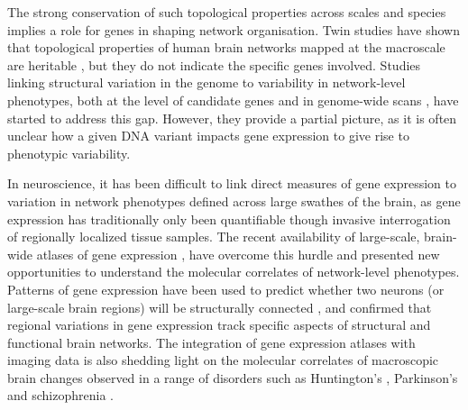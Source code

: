 The strong conservation of such topological properties across scales and species implies a role for genes in shaping network organisation. Twin studies have shown that topological properties of human brain networks mapped at the macroscale are heritable \citep{Smit2008,Fornito2011,VandenHeuvel2013e,Bohlken2014,Sinclair2015,Zhan2015,Colclough2017}, but they do not indicate the specific genes involved. Studies linking structural variation in the genome to variability in network-level phenotypes, both at the level of candidate genes \citep{Liu2010,Brown2011,Dennis2011,Markett2017} and in genome-wide scans \citep{Jahanshad2013}, have started to address this gap. However, they provide a partial picture, as it is often unclear how a given DNA variant impacts gene expression to give rise to phenotypic variability.

In neuroscience, it has been difficult to link direct measures of gene expression to variation in network phenotypes defined across large swathes of the brain, as gene expression has traditionally only been quantifiable though invasive interrogation of regionally localized tissue samples.
The recent availability of large-scale, brain-wide atlases of gene expression \mbox{\citep{Lein2007a,Hawrylycz2012}}, have overcome this hurdle and presented new opportunities to understand the molecular correlates of network-level phenotypes. Patterns of gene expression have been used to predict whether two neurons (or large-scale brain regions) will be structurally connected \citep{Varadan2006,Kaufman2006,Baruch2008,Wolf2011,French2011,Ji2014,Fakhry2015a}, and confirmed that regional variations in gene expression track specific aspects of structural \citep{Goel2014,Forest2017,Parkes2017,Romero-Garcia2018} and functional \citep{Cioli2014b,Richiardi2015,Hawrylycz2015,Krienen2016,Anderson2018} brain networks. The integration of gene expression atlases with imaging data is also shedding light on the molecular correlates of macroscopic brain changes observed in a range of disorders such as Huntington’s \citep{McColgan2018}, Parkinson’s \citep{Rittman2016} and schizophrenia \citep{Romme2017}.

